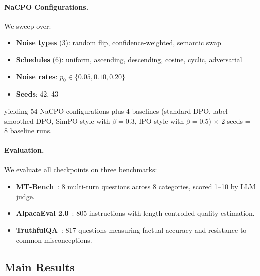 \documentclass{article}
\begin{document}
\paragraph{NaCPO Configurations.}
We sweep over:
\begin{itemize}[leftmargin=*, itemsep=0pt, topsep=2pt]
    \item \textbf{Noise types} (3): random flip, confidence-weighted, semantic swap
    \item \textbf{Schedules} (6): uniform, ascending, descending, cosine, cyclic, adversarial
    \item \textbf{Noise rates}: $p_0 \in \{0.05, 0.10, 0.20\}$
    \item \textbf{Seeds}: 42, 43
\end{itemize}
yielding 54 NaCPO configurations plus 4 baselines (standard DPO, label-smoothed DPO, SimPO-style with $\beta{=}0.3$, IPO-style with $\beta{=}0.5$) $\times$ 2 seeds = 8 baseline runs.

\paragraph{Evaluation.}
We evaluate all checkpoints on three benchmarks:
\begin{itemize}[leftmargin=*, itemsep=0pt, topsep=2pt]
    \item \textbf{MT-Bench}~\cite{PLACEHOLDER_zheng2023judging}: 8 multi-turn questions across 8 categories, scored 1--10 by LLM judge.
    \item \textbf{AlpacaEval 2.0}~\cite{PLACEHOLDER_dubois2024alpacaeval}: 805 instructions with length-controlled quality estimation.
    \item \textbf{TruthfulQA}~\cite{PLACEHOLDER_lin2022truthfulqa}: 817 questions measuring factual accuracy and resistance to common misconceptions.
\end{itemize}


\subsection{Main Results}

\end{document}
